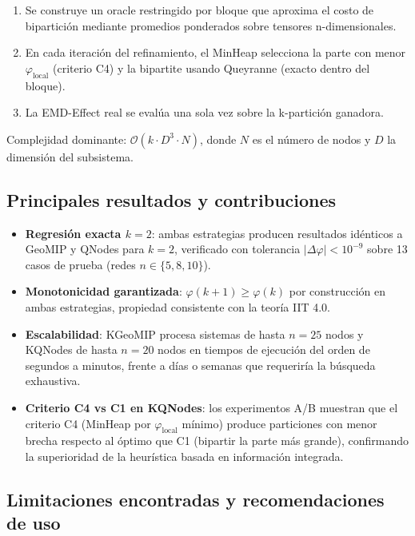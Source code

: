 \begin{enumerate}
  \item Se construye un oracle restringido por bloque que aproxima el costo de bipartición
        mediante promedios ponderados sobre tensores n-dimensionales.
  \item En cada iteración del refinamiento, el MinHeap selecciona la parte con menor
        $\varphi_{\text{local}}$ (criterio C4) y la bipartite usando Queyranne (exacto dentro
        del bloque).
  \item La EMD-Effect real se evalúa una sola vez sobre la k-partición ganadora.
\end{enumerate}

Complejidad dominante: $\mathcal{O}(k \cdot D^3 \cdot N)$, donde $N$ es el número de nodos
y $D$ la dimensión del subsistema.

\subsection{Principales resultados y contribuciones}

\begin{itemize}
  \item \textbf{Regresión exacta $k=2$}: ambas estrategias producen resultados idénticos a
        GeoMIP y QNodes para $k=2$, verificado con tolerancia $|\Delta\varphi| < 10^{-9}$ sobre
        13 casos de prueba (redes $n \in \{5, 8, 10\}$).

  \item \textbf{Monotonicidad garantizada}: $\varphi(k+1) \geq \varphi(k)$ por construcción
        en ambas estrategias, propiedad consistente con la teoría IIT 4.0.

  \item \textbf{Escalabilidad}: KGeoMIP procesa sistemas de hasta $n = 25$ nodos y KQNodes
        de hasta $n = 20$ nodos en tiempos de ejecución del orden de segundos a minutos,
        frente a días o semanas que requeriría la búsqueda exhaustiva.

  \item \textbf{Criterio C4 vs C1 en KQNodes}: los experimentos A/B muestran que el criterio
        C4 (MinHeap por $\varphi_{\text{local}}$ mínimo) produce particiones con menor brecha
        respecto al óptimo que C1 (bipartir la parte más grande), confirmando la superioridad
        de la heurística basada en información integrada.
\end{itemize}

\subsection{Limitaciones encontradas y recomendaciones de uso}


